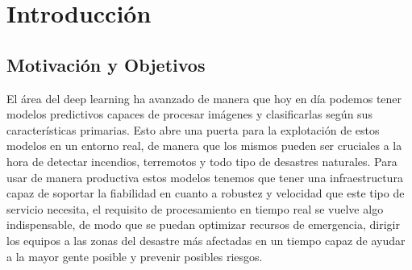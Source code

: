 \cleardoublepage


\chapter{Introducción}
\label{ch:chapter1}


\section{Motivación y Objetivos}\label{sec:motivación-y-objetivos}

El área del deep learning ha avanzado de manera que hoy en día podemos tener modelos predictivos capaces de procesar imágenes y clasificarlas según sus características primarias.
Esto abre una puerta para la explotación de estos modelos en un entorno real, de manera que los mismos pueden ser cruciales a la hora de detectar incendios, terremotos y todo tipo de
desastres naturales.
Para usar de manera productiva estos modelos tenemos que tener una infraestructura capaz de soportar la fiabilidad en cuanto a robustez y velocidad que este tipo de servicio necesita, el requisito de
procesamiento en tiempo real se vuelve algo indispensable, de modo que se puedan optimizar recursos de emergencia, dirigir los equipos a las zonas del desastre más afectadas en un tiempo
capaz de ayudar a la mayor gente posible y prevenir posibles riesgos.

